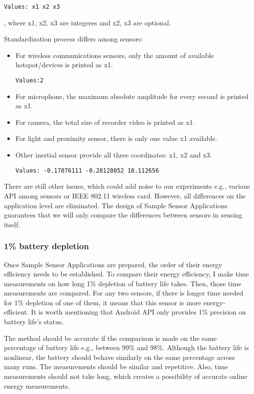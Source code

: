 \begin{lstlisting}[frame=single]
Values: x1 x2 x3
\end{lstlisting}, where x1, x2, x3 are integeres and x2, x3 are optional. 

Standardization process differs among sensors:
\begin{itemize}
	\item For wireless communications sensors, only the amount of available hotspot/devices is printed as x1. 
		\begin{lstlisting}[frame=single]
Values:2
		\end{lstlisting}
	\item For microphone, the maximum absolute amplitude for every second is printed as x1.
	\item For camera, the total size of recorder video is printed as x1.
	\item For light and proximity sensor, there is only one value x1 available.
	\item Other inertial sensor provide all three coordinates: x1, x2 and x3.
		\begin{lstlisting}[frame=single]
Values: -0.17076111 -0.28128052 10.112656
		\end{lstlisting}
\end{itemize}

There are still other issues, which could add noise to our experiments e.g., various API among sensors or IEEE 802.11 wireless card. However, all differences on the application level are eliminated. The design of Sample Sensor Applications guarantees that we will only compare the differences between sensors in sensing itself.
				
\subsubsection{1\% battery depletion}	
\label{s:design:measurements:method}
\hspace{10pt} Once  Sample Sensor Applications are prepared, the order of their energy efficiency needs to be established. To compare their energy efficiency, I make time measurements on how long 1\% depletion of battery life takes. Then, those time measurements are compared. For any two sensors, if there is longer time needed for 1\% depletion of one of them, it means that this sensor is more energy-efficient. It is worth mentioning that Android API only provides 1\% precision on battery life's status. 

The method should be accurate if the comparison is made on the same percentage of battery life e.g., between 99\% and 98\%. Although the battery life is nonlinear, the battery should behave similarly on the same percentage across many runs. The measurements should be similar and repetitive. Also, time measurements should not take long, which creates a possibility of accurate online energy measurements. 

